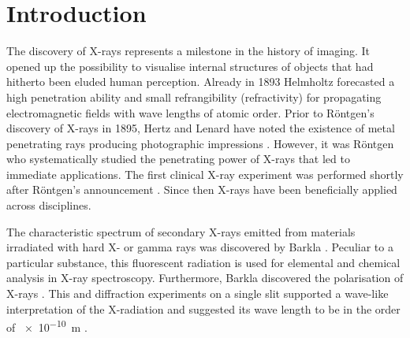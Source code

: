 \documentclass[
twoside,
openright,
titlepage,
numbers=noenddot,
headinclude,
fleqn,
a4paper,
footinclude=true,
cleardoublepage=empty,
abstractoff,
BCOR=5mm,
paper=a4,
fontsize=11pt,
british,ngerman,american,
]{scrreprt}
\begin{document}
\chapter{Introduction}
\label{cha:intro}

The discovery of X-rays represents a milestone in the history of
imaging.  It opened up the possibility to visualise internal
structures of objects that had hitherto been eluded human
perception. %
Already in 1893 Helmholtz forecasted a high penetration ability and
small refrangibility (refractivity) for propagating electromagnetic
fields with wave lengths of atomic order.  Prior to Röntgen's
discovery of X-rays in 1895, Hertz and Lenard have noted the existence
of metal penetrating rays producing photographic impressions
\cite{Glasser1934}.  However, it was Röntgen who systematically
studied the penetrating power of X-rays \cite{Roentgen1896} that led
to immediate applications.  The first clinical X-ray experiment was
performed shortly after Röntgen's announcement \cite{Spiegel1995}.
Since then X-rays have been beneficially applied across disciplines.

The characteristic spectrum of secondary X-rays emitted from materials
irradiated with hard X- or gamma rays was discovered by Barkla
\cite{Barkla1904}.  Peculiar to a particular substance, this
fluorescent radiation is used for elemental and chemical analysis in
X-ray spectroscopy.
Furthermore, Barkla discovered the polarisation of X-rays
\cite{Barkla1905}.  This and diffraction experiments on a single slit
supported a wave-like interpretation of the X-radiation and suggested
its wave length to be in the order of \SI{e-10}{m}
\cite{Sommerfeld1912}.
\end{document}
